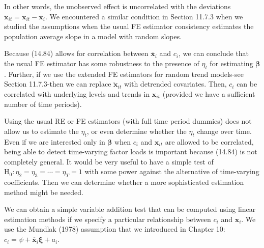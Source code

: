 \documentclass[10pt]{article}
\begin{document}
In other words, the unobserved effect is uncorrelated with the deviations $\ddot{\mathbf{x}}_{i t}= \mathbf{x}_{i t}-\overline{\mathbf{x}}_{i}$. We encountered a similar condition in Section 11.7.3 when we studied the assumptions when the usual FE estimator consistency estimates the population average slope in a model with random slopes.

Because (14.84) allows for correlation between $\overline{\mathbf{x}}_{i}$ and $c_{i}$, we can conclude that the usual FE estimator has some robustness to the presence of $\eta_{t}$ for estimating $\boldsymbol{\beta}$. Further, if we use the extended FE estimators for random trend models-see Section 11.7.3-then we can replace $\ddot{\mathbf{x}}_{i t}$ with detrended covariates. Then, $c_{i}$ can be correlated with underlying levels and trends in $\mathbf{x}_{i t}$ (provided we have a sufficient number of time periods).

Using the usual RE or FE estimators (with full time period dummies) does not allow us to estimate the $\eta_{t}$, or even determine whether the $\eta_{t}$ change over time. Even if we are interested only in $\boldsymbol{\beta}$ when $c_{i}$ and $\mathbf{x}_{i t}$ are allowed to be correlated, being able to detect time-varying factor loads is important because (14.84) is not completely general. It would be very useful to have a simple test of $\mathrm{H}_{0}: \eta_{2}=\eta_{3}=\cdots=\eta_{T}=1$ with some power against the alternative of time-varying coefficients. Then we can determine whether a more sophisticated estimation method might be needed.

We can obtain a simple variable addition test that can be computed using linear estimation methods if we specify a particular relationship between $c_{i}$ and $\mathbf{x}_{i}$. We use the Mundlak (1978) assumption that we introduced in Chapter 10:\\
$c_{i}=\psi+\overline{\mathbf{x}}_{i} \boldsymbol{\xi}+a_{i}$.
\end{document}
